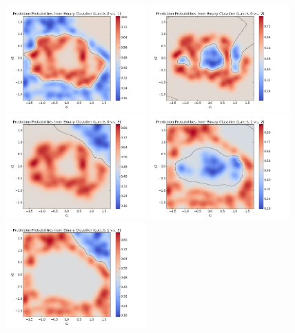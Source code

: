 				\begin{figure}[!htbp]
					\centering
						\includegraphics[width=0.48\textwidth]{Figures/Progress/modekeepingAVA/Figure9.png}
						\includegraphics[width=0.48\textwidth]{Figures/Progress/modekeepingAVA/Figure10.png}
						\includegraphics[width=0.48\textwidth]{Figures/Progress/modekeepingAVA/Figure11.png}
						\includegraphics[width=0.48\textwidth]{Figures/Progress/modekeepingAVA/Figure12.png}
						\includegraphics[width=0.48\textwidth]{Figures/Progress/modekeepingAVA/Figure13.png}

\end{figure}
